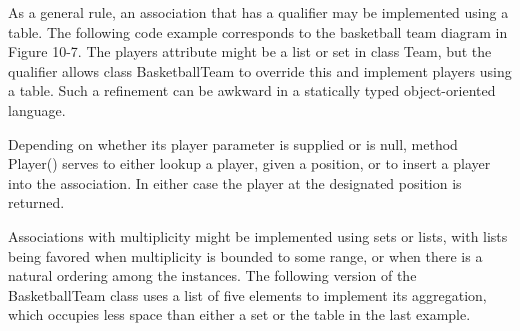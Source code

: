 
As a general rule, an association that has a qualifier may be
implemented using a table. The following code example corresponds to
the basketball team diagram in Figure 10-7. The players attribute might
be a list or set in class Team, but the qualifier allows class
BasketballTeam to override this and implement players using a table.
Such a refinement can be awkward in a statically typed object-oriented
language.

Depending on whether its player parameter is supplied or is null, method
\textsf{Player()} serves to either lookup a player, given a position,
or to insert a player into the association. In either case the player
at the designated position is returned.


Associations with multiplicity might be implemented using sets or lists,
with lists being favored when multiplicity is bounded to some range, or
when there is a natural ordering among the instances. The following
version of the \textsf{BasketballTeam} class uses a list of five
elements to implement its aggregation, which occupies less space than
either a set or the table in the last example.


